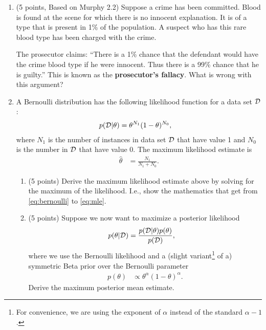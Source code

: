 \documentclass[10pt]{article}
\begin{document}
\begin{enumerate}

\item (5 points, Based on Murphy 2.2) Suppose a crime has been committed. Blood is found at the scene for which there is no innocent explanation. It is of a type that is present in 1\% of the population. A suspect who has this rare blood type has been charged with the crime.

The prosecutor claims: ``There is a 1\% chance that the defendant would have the crime blood type if he were innocent. Thus there is a 99\% chance that he is guilty.'' This is known as the \textbf{prosecutor's fallacy}. What is wrong with this argument?

\item A Bernoulli distribution has the following likelihood function for a data set $\cal D$:
\begin{align}
p({\cal D} | \theta) &= \theta^{N_1} (1 - \theta)^{N_0},
\label{eq:bernoulli}
\end{align}
where $N_1$ is the number of instances in data set $\cal D$ that have value 1 and $N_0$ is the number in $\cal D$ that have value 0. The maximum likelihood estimate is 
\begin{align}
\hat{\theta} &= \frac{N_1}{N_1 + N_0}.
\label{eq:mle}
\end{align}

\begin{enumerate}

\item (5 points) Derive the maximum likelihood estimate above by solving for the maximum of the likelihood. I.e., show the mathematics that get from \cref{eq:bernoulli} to \cref{eq:mle}.

\item (5 points) Suppose we now want to maximize a posterior likelihood
\begin{align}
p(\theta | {\cal D}) &= \frac{p({\cal D} | \theta) p(\theta)}{p({\cal D})},
\end{align}
where we use the Bernoulli likelihood and a (slight variant\footnote{For convenience, we are using the exponent of $\alpha$ instead of the standard $\alpha-1$.} of a) symmetric Beta prior over the Bernoulli parameter
\begin{align}
p(\theta) &\propto \theta^{\alpha} (1 - \theta)^{\alpha}.
\end{align}
Derive the maximum posterior mean estimate.

\end{enumerate}

\end{enumerate}
\end{document}
